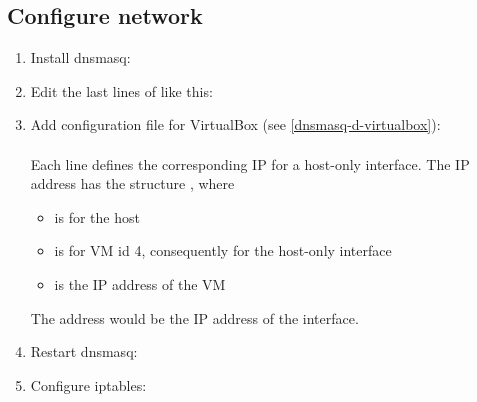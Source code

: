 \subsection{Configure network}
\begin{enumerate}
\item Install dnsmasq:\\
\item Edit the last lines of  like this:

\item Add configuration file for VirtualBox (see \ref{dnsmasq-d-virtualbox}):\\
\\
Each line defines the corresponding IP for a host-only interface.
The IP address has the structure , where
\begin{itemize}  \setlength{\parskip}{-6pt}
\item {} is for the host 
\item {} is for VM id 4, consequently for the host-only interface 
\item {} is the IP address of the VM
\end{itemize}
The address  would be the IP address of the interface.
\item Restart dnsmasq:\\

\item Configure iptables:\\
\end{enumerate}
